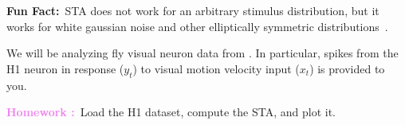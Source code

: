 \documentclass[a4paper,11pt]{exam}
\DeclareMathOperator*{\E}{\mathbb{E}} %
\newcounter{homework}
\newcommand{\homework}{\stepcounter{homework}\textcolor{violet}{\textbf{Homework \thehomework:}~}}
\newcommand{\funfact}{\textbf{Fun Fact:}~}
\begin{document}
\begin{questions}

\begin{tcolorbox}
    \funfact STA does not work for an arbitrary stimulus distribution, but it works for white gaussian noise and other elliptically symmetric distributions~\cite{Paninski2003,Park2013f}.
\end{tcolorbox}
We will be analyzing fly visual neuron data from \citet{De_Ruyter_van_Steveninck1997}.
In particular, spikes from the H1 neuron in response ($y_t$) to visual motion velocity input ($x_t$) is provided to you.

\question \homework Load the H1 dataset, compute the STA, and plot it.


\end{questions}
\end{document}
